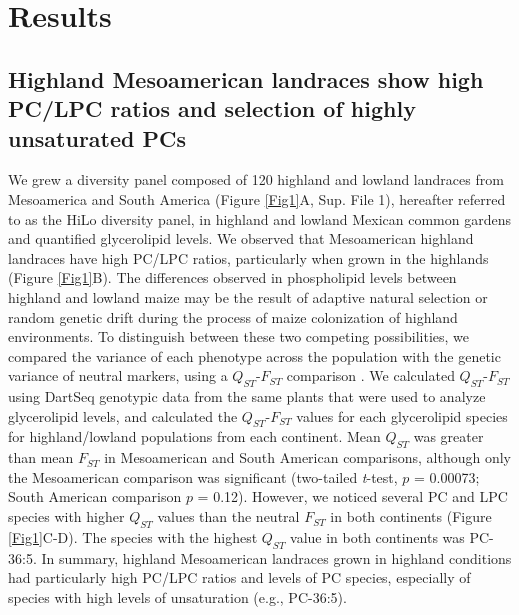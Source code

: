 \documentclass[9pt,twocolumn,twoside,lineno]{BioRxiv}
\begin{document}
\section{Results}
\label{sec:results}
\subsection{Highland Mesoamerican landraces show high PC/LPC ratios and selection of highly unsaturated PCs}
We grew a diversity panel composed of 120 highland and lowland landraces from Mesoamerica and South America (Figure \ref{Fig1}A, Sup. File 1), hereafter referred to as the HiLo diversity panel, in highland and lowland Mexican common gardens and quantified glycerolipid levels.    
We observed that Mesoamerican highland landraces have  high PC/LPC ratios,  particularly when grown in the highlands (Figure \ref{Fig1}B).
The differences observed in phospholipid levels between highland and lowland maize may be the result of adaptive natural selection or random genetic drift during the process of maize colonization of highland environments.
To distinguish between these two competing possibilities, we compared the variance of each phenotype across the population with the genetic variance of neutral markers, using a $Q_{ST}$-$F_{ST}$ comparison \cite{Leinonen2013-ic}.
We calculated $Q_{ST}$-$F_{ST}$ using DartSeq genotypic data from the same plants that were used to analyze glycerolipid levels, and calculated the $Q_{ST}$-$F_{ST}$ values for each glycerolipid species for highland/lowland populations from each continent. 
Mean $Q_{ST}$ was greater than mean $F_{ST}$ in Mesoamerican and South American comparisons, although only the Mesoamerican comparison was significant (two-tailed \textit{t}-test, $p$ = 0.00073; South American comparison $p$ = 0.12).
However, we noticed several PC and LPC species with higher $Q_{ST}$ values than the neutral $F_{ST}$ in both continents (Figure \ref{Fig1}C-D).
The species with the highest $Q_{ST}$ value in both continents was PC-36:5. 
In summary, highland Mesoamerican landraces grown in highland conditions had particularly high PC/LPC ratios and levels of PC species, especially of species with high levels of unsaturation (e.g., PC-36:5). 
\end{document}
